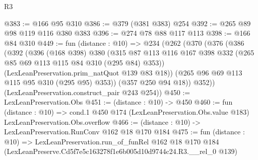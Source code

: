 \begin{lexlean}{R3}
\begin{coremodule}
@383 := @166 @95 @310
@386 := @379 (@381 @383) @254
@392 := @265 @89 @98 @119 @116 @380 @383
@396 := @274 @78 @88 @117 @113
@398 := @166 @84 @310
@449 := fun (distance : @10) =>
  @234
    (@262
      (@370
        (@376
          (@386
            (@392
              (@396
                (@168 @398)
                @380
                (@315
                  @87
                  @113
                  @116
                  @167
                  @398
                  @332
                  (@265 @85 @69 @113 @115 @84 @310 (@295 @84) @353))
                (LexLeanPreservation.prim_natQuot @139 @83 @18))
              (@265 @96 @69 @113 @115 @95 @310 (@295 @95) @353))
            (@357 @250 @94 @18))
          @352))
      (LexLeanPreservation.construct_pair @243 @254))
@450 := LexLeanPreservation.Obs
@451 := (distance : @10) -> @450
@460 := fun (distance : @10) =>
  cond.{1} @450 @174 (LexLeanPreservation.Obs.value @183) LexLeanPreservation.Obs.overflow
@466 := (distance : @10) -> LexLeanPreservation.RunConv @162 @18 @170 @184
@475 := fun (distance : @10) =>
  LexLeanPreservation.run_of_funRel
    @162
    @18
    @170
    @184
    (LexLeanPreserve.Cd5f7e5c163278f1e6b005d10d9744c24.R3.__rel_0 @139)
\end{coremodule}
\end{lexlean}
